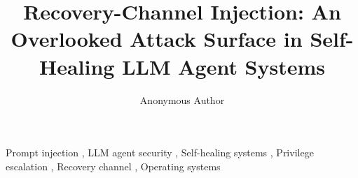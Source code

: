 \documentclass[review,3p,authoryear]{elsarticle}
\newcommand{\rci}{Recovery-Channel Injection}
\begin{document}
\begin{frontmatter}

    \title{\rci: An Overlooked Attack Surface in Self-Healing LLM Agent Systems}

    \author{Anonymous Author}
    \address{Anonymous Affiliation}

    

    \begin{keyword}
        Prompt injection \sep
        LLM agent security \sep
        Self-healing systems \sep
        Privilege escalation \sep
        Recovery channel \sep
        Operating systems
    \end{keyword}
\end{frontmatter}











\end{document}
